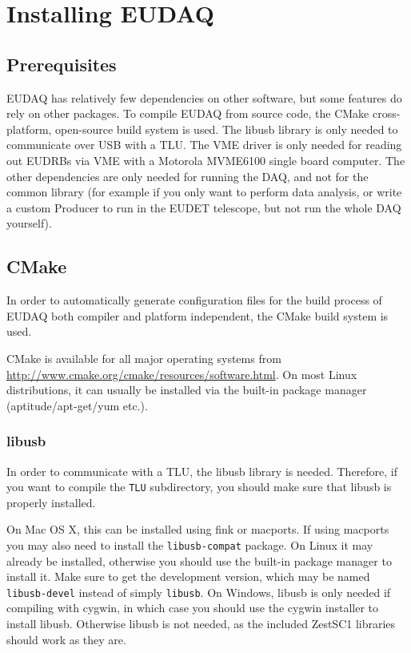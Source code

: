 \section{Installing EUDAQ}

\subsection{Prerequisites}
EUDAQ has relatively few dependencies on other software, but some
features do rely on other packages.
To compile EUDAQ from source code, the CMake cross-platform, open-source build system is used.
The libusb library is only needed to communicate over USB with a \gls{TLU}\cite{Cussans2009}.
The VME driver is only needed for reading out \glspl{EUDRB}\cite{Cotta2008}
via VME with a Motorola MVME6100 single board computer.
The other dependencies are only needed for running the DAQ, and not for the common library
(for example if you only want to perform data analysis,
or write a custom Producer to run in the EUDET telescope,
but not run the whole DAQ yourself).

\subsection{CMake}
In order to automatically generate configuration files for the build
process of EUDAQ both compiler and platform independent, the CMake
build system is used.

CMake is available for all major operating systems from
\url{http://www.cmake.org/cmake/resources/software.html}. On most
Linux distributions, it can usually be installed via the built-in
package manager (aptitude/apt-get/yum etc.).

\subsubsection{libusb}
In order to communicate with a \gls{TLU}, the libusb library is needed.
Therefore, if you want to compile the \texttt{TLU} subdirectory, you should make sure that libusb is properly installed.

On Mac OS X, this can be installed using fink or macports.
If using macports you may also need to install the \texttt{libusb-compat} package.
On Linux it may already be installed,
otherwise you should use the built-in package manager to install it.
Make sure to get the development version, which may be named \texttt{libusb-devel} instead of simply \texttt{libusb}.
On Windows, libusb is only needed if compiling with cygwin,
in which case you should use the cygwin installer to install libusb.
Otherwise libusb is not needed, as the included ZestSC1 libraries should work as they are.

